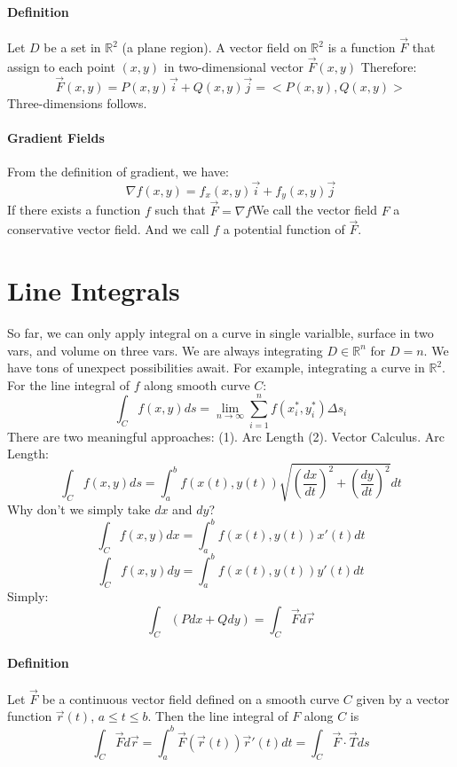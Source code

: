 \documentclass[11pt, oneside]{article}   	%
\begin{document}
\paragraph{Definition} Let $D$ be a set in $\mathbb{R}^2$ (a plane region). A vector field on $\mathbb{R}^2$ is a function $\vec{F}$ that assign to each point $(x,y)$ in two-dimensional vector $\vec{F}(x,y)$
Therefore: $$\vec{F}(x,y)=P(x,y)\vec{i} +Q(x,y)\vec{j}=<P(x,y),Q(x,y)>$$
Three-dimensions follows.
\paragraph{Gradient Fields}
From the definition of gradient, we have: $$\nabla f(x,y) = f_x(x,y)\vec{i}+f_y(x,y)\vec{j}$$ If there exists a function $f$ such that $\vec{F}=\nabla f$We call the vector field $F$ a conservative vector field.
And we call $f$ a potential function of $\vec{F}$.
\section{Line Integrals}
So far, we can only apply integral on a curve in single varialble, surface in two vars, and volume on three vars. We are always integrating $D\in \mathbb{R}^n$ for $D=n$. We have tons of unexpect possibilities await.
For example, integrating a curve in $\mathbb{R}^2$.
For the line integral of $f$ along smooth curve $C$: $$\int_C f(x,y)ds = \lim_{n\to\infty}\sum_{i=1}^n f(x_i^\ast,y_i^\ast)\Delta s_i$$
There are two meaningful approaches: (1). Arc Length (2). Vector Calculus.
Arc Length: $$\int_C f(x,y)ds = \int_a^b f(x(t),y(t))\sqrt{(\frac{dx}{dt})^2+(\frac{dy}{dt})^2}dt$$
Why don't we simply take $dx$ and $dy$? $$\int_C f(x,y)dx=\int_a^b f(x(t),y(t)) x'(t) dt$$ $$\int_C f(x,y)dy=\int_a^b f(x(t),y(t)) y'(t) dt$$
Simply: $$\int_C (Pdx+Qdy) = \int_C \vec{F}d\vec{r}$$
\paragraph{Definition} Let $\vec{F}$ be a continuous vector field defined on a smooth curve $C$ given by a vector function $\vec{r}(t)$, $a\leq t\leq b$. Then the line integral of $F$ along $C$ is
$$\int_C \vec{F}d\vec{r} = \int_a^b\vec{F}(\vec{r}(t))\vec{r}'(t)dt=\int_C \vec{F}\cdot\vec{T}ds$$
\end{document}
